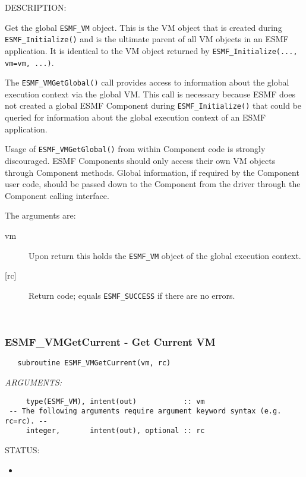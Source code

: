{\sf DESCRIPTION:\\ }


     \begin{sloppypar}
     Get the global {\tt ESMF\_VM} object. This is the VM object
     that is created during {\tt ESMF\_Initialize()} and is the ultimate
     parent of all VM objects in an ESMF application. It is identical to the VM
     object returned by {\tt ESMF\_Initialize(..., vm=vm, ...)}.
     \end{sloppypar}
  
     The {\tt ESMF\_VMGetGlobal()} call provides access to information about the
     global execution context via the global VM. This call is necessary because
     ESMF does not created a global ESMF Component during
     {\tt ESMF\_Initialize()} that could be queried for information about
     the global execution context of an ESMF application.
  
     Usage of {\tt ESMF\_VMGetGlobal()} from within Component code is
     strongly discouraged. ESMF Components should only access their own VM
     objects through Component methods. Global information, if required by
     the Component user code, should be passed down to the Component from the 
     driver through the Component calling interface.
  
     The arguments are:
     \begin{description}
     \item[vm] 
       Upon return this holds the {\tt ESMF\_VM} object of the global execution 
       context.
     \item[{[rc]}] 
       Return code; equals {\tt ESMF\_SUCCESS} if there are no errors.
     \end{description}
   
 
\mbox{}\hrulefill\ 
 
\subsubsection [ESMF\_VMGetCurrent] {ESMF\_VMGetCurrent - Get Current VM}


 
\begin{verbatim}   subroutine ESMF_VMGetCurrent(vm, rc)\end{verbatim}{\em ARGUMENTS:}
\begin{verbatim}     type(ESMF_VM), intent(out)           :: vm
 -- The following arguments require argument keyword syntax (e.g. rc=rc). --
     integer,       intent(out), optional :: rc           \end{verbatim}
{\sf STATUS:}
   \begin{itemize}
   \item{}
   \end{itemize}
  
